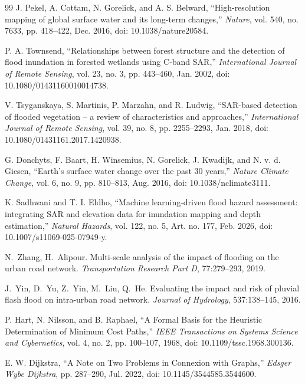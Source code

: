 \documentclass[10pt,twocolumn]{article}
\begin{document}
{\begin{thebibliography}{99}
J. Pekel, A. Cottam, N. Gorelick, and A. S. Belward, ``High-resolution mapping of global surface water and its long-term changes,'' \emph{Nature}, vol. 540, no. 7633, pp. 418--422, Dec. 2016, doi: 10.1038/nature20584.

P. A. Townsend, ``Relationships between forest structure and the detection of flood inundation in forested wetlands using C-band SAR,'' \emph{International Journal of Remote Sensing}, vol. 23, no. 3, pp. 443--460, Jan. 2002, doi: 10.1080/01431160010014738.

V. Tsyganskaya, S. Martinis, P. Marzahn, and R. Ludwig, ``SAR-based detection of flooded vegetation -- a review of characteristics and approaches,'' \emph{International Journal of Remote Sensing}, vol. 39, no. 8, pp. 2255--2293, Jan. 2018, doi: 10.1080/01431161.2017.1420938.

G. Donchyts, F. Baart, H. Winsemius, N. Gorelick, J. Kwadijk, and N. v. d. Giesen, ``Earth's surface water change over the past 30 years,'' \emph{Nature Climate Change}, vol. 6, no. 9, pp. 810--813, Aug. 2016, doi: 10.1038/nclimate3111.

K. Sadhwani and T. I. Eldho, ``Machine learning-driven flood hazard assessment: integrating SAR and elevation data for inundation mapping and depth estimation,'' \emph{Natural Hazards}, vol. 122, no. 5, Art. no. 177, Feb. 2026, doi: 10.1007/s11069-025-07949-y.

N.~Zhang, H.~Alipour. Multi-scale analysis of the impact of flooding on the urban road network. \emph{Transportation Research Part D}, 77:279--293, 2019.

J.~Yin, D.~Yu, Z.~Yin, M.~Liu, Q.~He. Evaluating the impact and risk of pluvial flash flood on intra-urban road network. \emph{Journal of Hydrology}, 537:138--145, 2016.

P. Hart, N. Nilsson, and B. Raphael, ``A Formal Basis for the Heuristic Determination of Minimum Cost Paths,'' \emph{IEEE Transactions on Systems Science and Cybernetics}, vol. 4, no. 2, pp. 100--107, 1968, doi: 10.1109/tssc.1968.300136.

E. W. Dijkstra, ``A Note on Two Problems in Connexion with Graphs,'' \emph{Edsger Wybe Dijkstra}, pp. 287--290, Jul. 2022, doi: 10.1145/3544585.3544600.


\end{thebibliography}}
\end{document}
